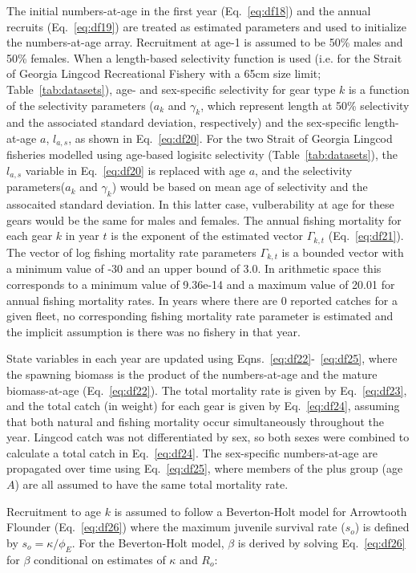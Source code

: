 The initial numbers-at-age in the first year (Eq.~\ref{eq:df18}) and the annual recruits (Eq.~\ref{eq:df19}) are treated as estimated parameters and used to initialize the numbers-at-age array. Recruitment at age-1 is assumed to be 50\% males and 50\% females. When a length-based selectivity function is used (i.e. for the Strait of Georgia Lingcod Recreational Fishery with a 65cm size limit; Table~\ref{tab:datasets}), age- and sex-specific selectivity for gear type $k$ is a function of the selectivity parameters ($a_k$ and $\gamma_k$, which represent length at 50\% selectivity and the associated standard deviation, respectively) and the sex-specific length-at-age $a$, $l_{a,s}$, as shown in Eq.~\ref{eq:df20}. For the two Strait of Georgia Lingcod fisheries modelled using age-based logisitc selectivity (Table~\ref{tab:datasets}), the $l_{a,s}$ variable in Eq.~\ref{eq:df20} is replaced with age $a$, and the selectivity parameters($a_k$ and $\gamma_k$) would be based on mean age of selectivity and the assocaited standard deviation. In this latter case, vulberability at age for these gears would be the same for males and females. The annual fishing mortality for each gear $k$ in year $t$ is the exponent of the estimated vector $\Gamma_{k,t}$ (Eq.~\ref{eq:df21}). The vector of log fishing mortality rate parameters $\Gamma_{k,t}$ is a bounded vector with a minimum value of -30 and an upper bound of 3.0. In arithmetic space this corresponds to a minimum value of 9.36e-14 and a maximum value of 20.01 for annual fishing mortality rates. In years where there are 0 reported catches for a given fleet, no corresponding fishing mortality rate parameter is estimated and the implicit assumption is there was no fishery in that year.

State variables in each year are updated using Eqns.~\ref{eq:df22}-~\ref{eq:df25}, where the spawning biomass is the product of the numbers-at-age and the mature biomass-at-age (Eq.~\ref{eq:df22}). The total mortality rate is given by Eq.~\ref{eq:df23}, and the total catch (in weight) for each gear is given by Eq.~\ref{eq:df24}, assuming that both natural and fishing mortality occur simultaneously throughout the year. Lingcod catch was not differentiated by sex, so both sexes were combined to calculate a total catch in Eq.~\ref{eq:df24}. The sex-specific numbers-at-age are propagated over time using Eq.~\ref{eq:df25}, where members of the plus group (age $A$) are all assumed to have the same total mortality rate.

Recruitment to age $k$ is assumed to follow a Beverton-Holt model for Arrowtooth Flounder (Eq.~\ref{eq:df26}) where the maximum juvenile survival rate ($s_o$) is defined by $s_o=\kappa/\phi_E$. For the Beverton-Holt model, $\beta$ is derived by solving Eq.~\ref{eq:df26} for $\beta$ conditional on estimates of $\kappa$ and $R_o$:

